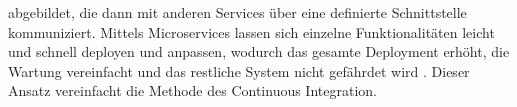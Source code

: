 abgebildet, die dann mit anderen Services über eine definierte Schnittstelle kommuniziert. Mittels Microservices lassen sich einzelne Funktionalitäten leicht und schnell deployen und anpassen, wodurch das gesamte Deployment erhöht, die Wartung vereinfacht und das restliche System nicht gefährdet wird \cite[S. 85 - 86]{kim_devops-handbuch_2017}. Dieser Ansatz vereinfacht die Methode des Continuous Integration.










 











  











 






